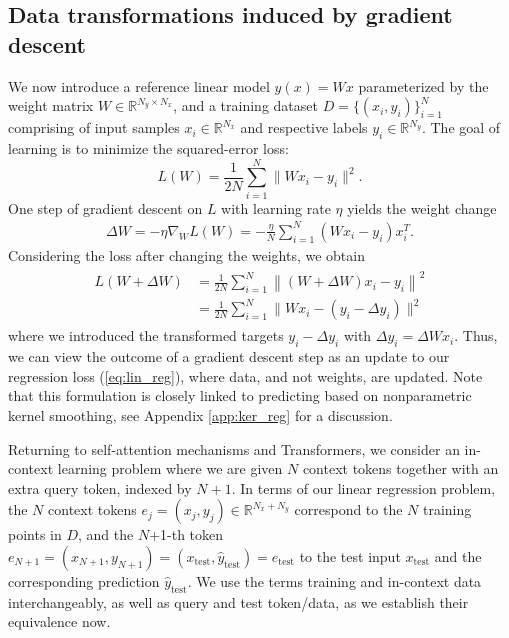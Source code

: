 \documentclass{article}
\theoremstyle{plain}
\theoremstyle{definition}
\theoremstyle{remark}
\begin{document}
\subsection*{Data transformations induced by gradient descent}
 
We now introduce a reference linear model $y(x) = W x$ parameterized by the weight matrix $W \in \mathbb{R}^{N_y \times N_x}$, and a training dataset $D = \{(x_i, y_i)\}_{i=1}^{N}$ comprising of input samples $x_i \in \mathbb{R}^{N_x}$ and respective labels $y_i \in \mathbb{R}^{N_y}$. The goal of learning is to minimize the squared-error loss:
\begin{equation}
\label{eq:lin_reg}
L(W) = \frac{1}{2N}\sum_{i=1}^{N} \|Wx_i - y_i\|^2. %
\end{equation}
One step of gradient descent on $L$ with learning rate $\eta$ yields the weight change
\begin{align}
\label{eq:gd_lin_reg}
    \Delta W = - \eta \nabla_W L(W) = - \frac{\eta}{N} \sum_{i=1}^{N}(Wx_i - y_i)x_i^T.
\end{align} Considering the loss after changing the weights, we obtain
\begin{align}
\begin{split}
\label{eq:lin_reg_changed}
L(W + \Delta W) &= \frac{1}{2N} \sum_{i=1}^{N}\left\|(W + \Delta W)x_i - y_i\right\|^2 \\
&= \frac{1}{2N} \sum_{i=1}^{N} \|Wx_i  - (y_i - \Delta y_i)\|^2 %
\end{split}
\end{align}
where we introduced the transformed targets $y_i - \Delta y_i$ with $\Delta y_i = \Delta W x_i$. Thus, we can view the outcome of a gradient descent step as an update to our regression loss (\eqref{eq:lin_reg}), where data, and not weights, are updated. Note that this formulation is closely linked to predicting based on nonparametric kernel smoothing, see Appendix \ref{app:ker_reg} for a discussion.

Returning to self-attention mechanisms and Transformers, we consider an in-context learning problem where we are given $N$ context tokens together with an extra query token, indexed by $N+1$. In terms of our linear regression problem, the $N$ context tokens $e_j = (x_j, y_j) \in \mathbb{R}^{N_x+N_y}$ correspond to the $N$ training points in $D$, and the $N$+1-th token $e_{N+1} = (x_{N+1}, y_{N+1}) = (x_{\text{test}}, \hat{y}_{\text{test}}) = e_{\text{test}}$ to the test input $x_{\text{test}}$ and the corresponding
prediction $\hat{y}_{\text{test}}$. We use the terms training and in-context data interchangeably, as well as query and test token/data, as we establish their equivalence now. 
\end{document}
